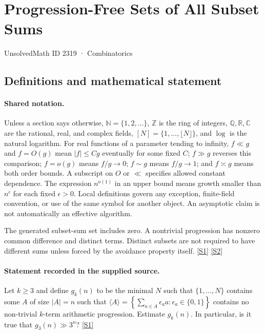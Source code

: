 \documentclass[11pt,a4paper]{article}
\newcommand{\N}{\mathbb{N}}
\newcommand{\Z}{\mathbb{Z}}
\newcommand{\Q}{\mathbb{Q}}
\newcommand{\R}{\mathbb{R}}
\newcommand{\C}{\mathbb{C}}
\newcommand{\sref}[2]{\hyperlink{source:#1:#2}{[S#2]}}
\begin{document}

\setcounter{section}{2318}

\section{Progression-Free Sets of All Subset Sums}\label{2319}

{\small\sffamily UnsolvedMath ID 2319 · Combinatorics}

\subsection{Definitions and mathematical statement}

\paragraph{Shared notation.}Unless a section says otherwise, $\N=\{1,2,\ldots\}$,
$\Z$ is the ring of integers, $\Q,\R,\C$ are the rational, real, and complex
fields, $[N]=\{1,\ldots,\lfloor N\rfloor\}$, and $\log$ is the natural
logarithm. For real functions of a parameter tending to infinity,
$f\ll g$ and $f=O(g)$ mean $|f|\leq Cg$ eventually for some fixed $C$;
$f\gg g$ reverses this comparison; $f=o(g)$ means $f/g\to0$;
$f\sim g$ means $f/g\to1$; and $f\asymp g$ means both order bounds.
A subscript on $O$ or $\ll$ specifies allowed constant dependence.
The expression $n^{o(1)}$ in an upper bound means growth smaller than
$n^\epsilon$ for each fixed $\epsilon>0$. Local definitions govern any
exception, finite-field convention, or use of the same symbol for another
object. An asymptotic claim is not automatically an effective algorithm.



The generated subset-sum set includes zero. A nontrivial progression has nonzero common difference and distinct terms. Distinct subsets are not required to have different sums unless forced by the avoidance property itself. \sref{2319}{1} \sref{2319}{2}

\paragraph{Statement recorded in the supplied source.}
Let $k\geq 3$ and define $g_k(n)$ to be the minimal $N$ such that $\{1,\ldots,N\}$ contains some $A$ of size $\lvert A\rvert=n$ such that $ \langle A\rangle = \left\{\sum_{a\in A}\epsilon_aa: \epsilon_a\in \{0,1\}\right\} $ contains no non-trivial $k$-term arithmetic progression. Estimate $g_k(n)$. In particular, is it true that $ g_3(n) \gg 3^n? $ \sref{2319}{1}
\end{document}
